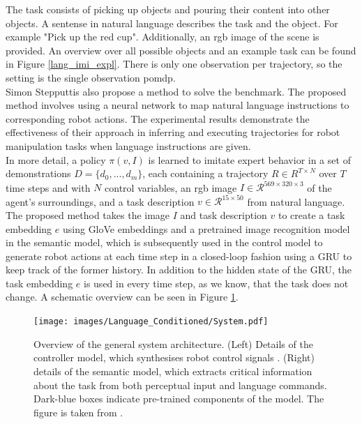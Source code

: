 The task consists of picking up objects and pouring their content into other objects. A sentense in natural language describes the task and the object. 
For example "Pick up the red cup". Additionally, an rgb image of the scene is provided. An overview over 
all possible objects and an example task can be found in Figure \ref{lang_imi_expl}. 
There is only one observation per trajectory, so the setting is the single observation \ac{pomdp}.  \\


Simon Stepputtis \etAl \cite{stepputtis2020languageconditioned} also propose a method to solve the benchmark. 
The proposed method involves using a neural network to map natural language instructions to 
corresponding robot actions. The experimental results demonstrate the effectiveness of their approach in inferring and executing trajectories for robot manipulation 
tasks when language instructions are given. \\

In more detail, a policy $\pi(v,I)$ is learned to imitate expert behavior in a set of demonstrations $D = \{d_0,...,d_m\}$, each containing a trajectory 
$R \in R^{T \times N}$ over $T$ time steps and with $N$ control variables, an rgb image $I \in \mathcal{R}^{569 \times 320 \times 3}$ of the agent's surroundings, 
and a task description $v \in \mathcal{R}^{15 \times 50}$ from natural language. The proposed method takes the image $I$ and task description $v$ 
to create a task embedding $e$ using GloVe embeddings and a pretrained image recognition model in the semantic model, 
which is subsequently used in the control model to generate robot actions at each time step in a closed-loop 
fashion using a GRU to keep track of the former history. In addition to the hidden state of the GRU, 
the task embedding $e$ is used in every time step, as we know, that the task does not change. A schematic overview can be seen in Figure \ref{language_imitation}. \\

\begin{figure}[htbp]
    \centering
    \texttt{[image: images/Language\_Conditioned/System.pdf]}
    \caption{Overview of the general system architecture. (Left) Details of the controller model, which
    synthesises robot control signals . (Right) details of the semantic model, which extracts critical
    information about the task from both perceptual input and language commands. Dark-blue boxes
    indicate pre-trained components of the model. The figure is taken from \cite{stepputtis2020languageconditioned}.}
    \label{language_imitation}
\end{figure}


